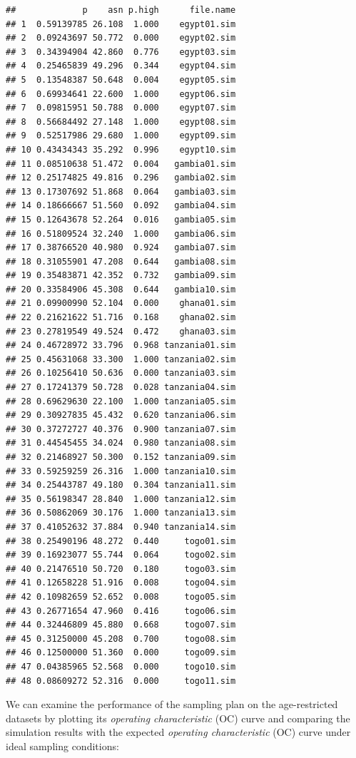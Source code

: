 \documentclass[12pt,a4paper]{book}
\theoremstyle{definition}
\theoremstyle{definition}
\theoremstyle{definition}
\theoremstyle{remark}
\begin{document}
\begin{verbatim}
##             p    asn p.high      file.name
## 1  0.59139785 26.108  1.000    egypt01.sim
## 2  0.09243697 50.772  0.000    egypt02.sim
## 3  0.34394904 42.860  0.776    egypt03.sim
## 4  0.25465839 49.296  0.344    egypt04.sim
## 5  0.13548387 50.648  0.004    egypt05.sim
## 6  0.69934641 22.600  1.000    egypt06.sim
## 7  0.09815951 50.788  0.000    egypt07.sim
## 8  0.56684492 27.148  1.000    egypt08.sim
## 9  0.52517986 29.680  1.000    egypt09.sim
## 10 0.43434343 35.292  0.996    egypt10.sim
## 11 0.08510638 51.472  0.004   gambia01.sim
## 12 0.25174825 49.816  0.296   gambia02.sim
## 13 0.17307692 51.868  0.064   gambia03.sim
## 14 0.18666667 51.560  0.092   gambia04.sim
## 15 0.12643678 52.264  0.016   gambia05.sim
## 16 0.51809524 32.240  1.000   gambia06.sim
## 17 0.38766520 40.980  0.924   gambia07.sim
## 18 0.31055901 47.208  0.644   gambia08.sim
## 19 0.35483871 42.352  0.732   gambia09.sim
## 20 0.33584906 45.308  0.644   gambia10.sim
## 21 0.09900990 52.104  0.000    ghana01.sim
## 22 0.21621622 51.716  0.168    ghana02.sim
## 23 0.27819549 49.524  0.472    ghana03.sim
## 24 0.46728972 33.796  0.968 tanzania01.sim
## 25 0.45631068 33.300  1.000 tanzania02.sim
## 26 0.10256410 50.636  0.000 tanzania03.sim
## 27 0.17241379 50.728  0.028 tanzania04.sim
## 28 0.69629630 22.100  1.000 tanzania05.sim
## 29 0.30927835 45.432  0.620 tanzania06.sim
## 30 0.37272727 40.376  0.900 tanzania07.sim
## 31 0.44545455 34.024  0.980 tanzania08.sim
## 32 0.21468927 50.300  0.152 tanzania09.sim
## 33 0.59259259 26.316  1.000 tanzania10.sim
## 34 0.25443787 49.180  0.304 tanzania11.sim
## 35 0.56198347 28.840  1.000 tanzania12.sim
## 36 0.50862069 30.176  1.000 tanzania13.sim
## 37 0.41052632 37.884  0.940 tanzania14.sim
## 38 0.25490196 48.272  0.440     togo01.sim
## 39 0.16923077 55.744  0.064     togo02.sim
## 40 0.21476510 50.720  0.180     togo03.sim
## 41 0.12658228 51.916  0.008     togo04.sim
## 42 0.10982659 52.652  0.008     togo05.sim
## 43 0.26771654 47.960  0.416     togo06.sim
## 44 0.32446809 45.880  0.668     togo07.sim
## 45 0.31250000 45.208  0.700     togo08.sim
## 46 0.12500000 51.360  0.000     togo09.sim
## 47 0.04385965 52.568  0.000     togo10.sim
## 48 0.08609272 52.316  0.000     togo11.sim
\end{verbatim}

We can examine the performance of the sampling plan on the
age-restricted datasets by plotting its \emph{operating characteristic}
(OC) curve and comparing the simulation results with the expected
\emph{operating characteristic} (OC) curve under ideal sampling
conditions:
\end{document}
